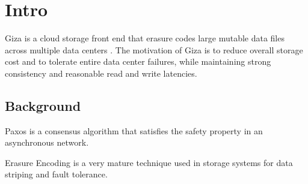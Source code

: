 \section{Intro}
Giza is a cloud storage front end that erasure codes large mutable data files across multiple data centers . The motivation of Giza is to reduce overall storage cost and to tolerate entire data center failures, while maintaining strong consistency and reasonable read and write latencies.

\subsection{Background}
Paxos is a consensus algorithm that satisfies the safety property in an asynchronous network. 
\par
Erasure Encoding is a very mature technique used in storage systems for data striping and fault tolerance.
